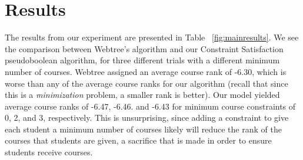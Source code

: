 
\section{Results}
\label{sec:results}


The results from our experiment are presented in Table
~\ref{fig:mainresults}. We see the comparison between Webtree's
algorithm and our Constraint Satisfaction pseudoboolean algorithm, for
three different trials with a different minimum number of
courses. Webtree assigned an average course rank of -6.30, which is
worse than any of the average course ranks for our algorithm (recall
that since this is a \emph{minimization} problem, a smaller rank is
better). Our model yielded average course ranks of -6.47, -6.46. and
-6.43 for minimum course constraints of 0, 2, and 3,
respectively. This is unsurprising, since adding a constraint to give
each student a minimum number of courses likely will reduce the rank
of the courses that students are given, a sacrifice that is made in
order to ensure students receive courses.

